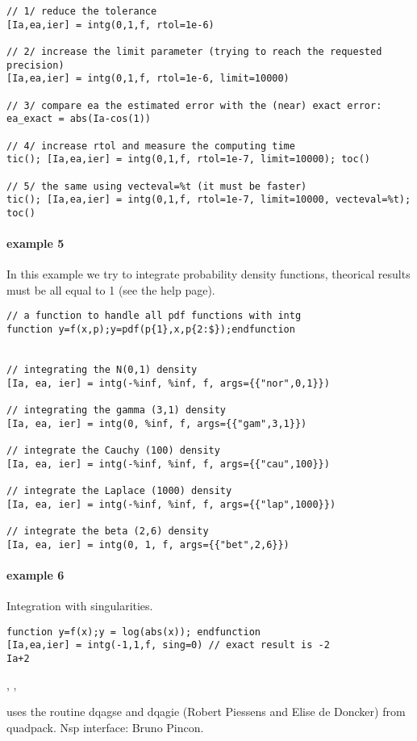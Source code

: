 \begin{examples}
\begin{Verbatim}
// 1/ reduce the tolerance
[Ia,ea,ier] = intg(0,1,f, rtol=1e-6)

// 2/ increase the limit parameter (trying to reach the requested precision)
[Ia,ea,ier] = intg(0,1,f, rtol=1e-6, limit=10000)

// 3/ compare ea the estimated error with the (near) exact error:
ea_exact = abs(Ia-cos(1))

// 4/ increase rtol and measure the computing time
tic(); [Ia,ea,ier] = intg(0,1,f, rtol=1e-7, limit=10000); toc()

// 5/ the same using vecteval=%t (it must be faster)
tic(); [Ia,ea,ier] = intg(0,1,f, rtol=1e-7, limit=10000, vecteval=%t); toc()
\end{Verbatim}

  
\paragraph{example 5} In this example we try to integrate probability 
density functions, theorical results must be all equal to 1 (see the
 help page). 
\begin{Verbatim}
// a function to handle all pdf functions with intg
function y=f(x,p);y=pdf(p{1},x,p{2:$});endfunction


// integrating the N(0,1) density
[Ia, ea, ier] = intg(-%inf, %inf, f, args={{"nor",0,1}})

// integrating the gamma (3,1) density
[Ia, ea, ier] = intg(0, %inf, f, args={{"gam",3,1}})

// integrate the Cauchy (100) density
[Ia, ea, ier] = intg(-%inf, %inf, f, args={{"cau",100}})

// integrate the Laplace (1000) density
[Ia, ea, ier] = intg(-%inf, %inf, f, args={{"lap",1000}})

// integrate the beta (2,6) density
[Ia, ea, ier] = intg(0, 1, f, args={{"bet",2,6}})
\end{Verbatim}
  
\paragraph{example 6} Integration with singularities.
\begin{Verbatim}
function y=f(x);y = log(abs(x)); endfunction
[Ia,ea,ier] = intg(-1,1,f, sing=0) // exact result is -2
Ia+2
\end{Verbatim}

\end{examples}

\begin{manseealso}
  , ,    
\end{manseealso}

\begin{authors}
  uses the routine dqagse and dqagie (Robert Piessens and Elise de Doncker) from
  quadpack. Nsp interface: Bruno Pincon.
\end{authors}
